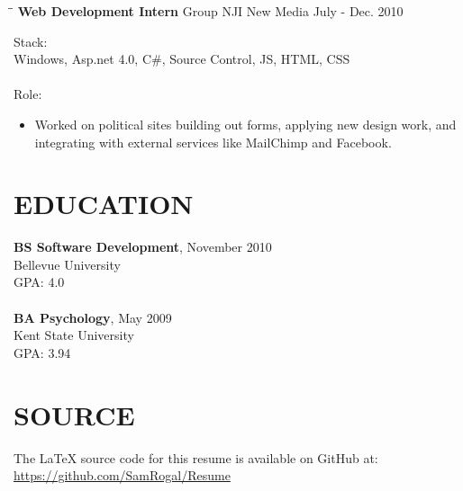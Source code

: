 \documentclass{res}
\begin{document}
\begin{resume}
	
	\begin{tabbing}
		\hspace{2.3in}\= \hspace{2.6in}\= \kill %
		\textbf{Web Development Intern} \>Group NJI New Media \> July - Dec. 2010 \\
   \end{tabbing}\vspace{-20pt}
   
    Stack: \\
	Windows, Asp.net 4.0, C\#, Source Control, JS, HTML, CSS \\
	\\
	Role: \\
	\vspace{-0.15in}
	\begin{itemize}
		\item Worked on political sites building out forms, applying new design work, and integrating with external services like MailChimp and Facebook.
	\end{itemize}
	
	
	
\section{EDUCATION}
    \textbf{BS Software Development}, November 2010 \\
    Bellevue University \\    
    GPA: 4.0 \\  
    \\
    \textbf{BA Psychology}, May 2009 \\
    Kent State University \\    
    GPA: 3.94
	
	
\section{SOURCE}
	The LaTeX source code for this resume is available on GitHub at: \\
	\url{https://github.com/SamRogal/Resume}
 
\end{resume}
\end{document}
